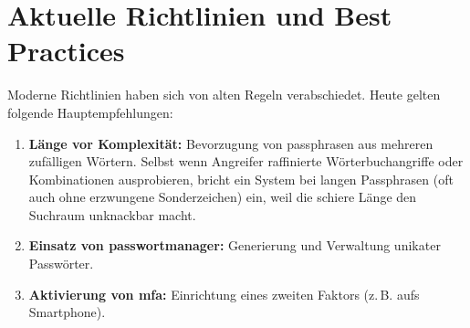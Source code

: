 \documentclass[12pt,a4paper]{article}
\begin{document}
\section{Aktuelle Richtlinien und Best Practices}
Moderne Richtlinien haben sich von alten Regeln verabschiedet. Heute gelten folgende Hauptempfehlungen:
\begin{enumerate}
    \item \textbf{Länge vor Komplexität:} Bevorzugung von \gls{passphrase}n aus mehreren zufälligen Wörtern. Selbst wenn Angreifer raffinierte Wörterbuchangriffe oder Kombinationen ausprobieren, bricht ein System bei langen Passphrasen (oft auch ohne erzwungene Sonderzeichen) ein, weil die schiere Länge den Suchraum unknackbar macht.
    \item \textbf{Einsatz von \gls{passwortmanager}:} Generierung und Verwaltung unikater Passwörter.
    \item \textbf{Aktivierung von \gls{mfa}:} Einrichtung eines zweiten Faktors (z.\,B. aufs Smartphone).
\end{enumerate}

\newpage
\printbibliography[heading=bibintoc, title={Literaturverzeichnis}]

\vspace{1cm}
\printglossaries
\end{document}
